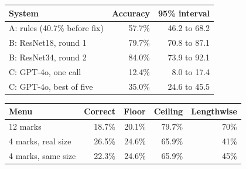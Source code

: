 \documentclass[border=6pt,multi=page]{standalone}
\begin{document}
\begin{page}
\begin{tabular}{lrr}\toprule
System & Accuracy & 95\% interval \\ \midrule
A: rules (40.7\% before fix) & 57.7\% & 46.2 to 68.2 \\
B: ResNet18, round 1 & 79.7\% & 70.8 to 87.1 \\
B: ResNet34, round 2 & 84.0\% & 73.9 to 92.1 \\
C: GPT-4o, one call & 12.4\% & 8.0 to 17.4 \\
C: GPT-4o, best of five & 35.0\% & 24.6 to 45.5 \\ \bottomrule
\end{tabular}
\end{page}
\begin{page}
\begin{tabular}{lrrrr}\toprule
Menu & Correct & Floor & Ceiling & Lengthwise \\ \midrule
12 marks & 18.7\% & 20.1\% & 79.7\% & 70\% \\
4 marks, real size & 26.5\% & 24.6\% & 65.9\% & 41\% \\
4 marks, same size & 22.3\% & 24.6\% & 65.9\% & 45\% \\ \bottomrule
\end{tabular}
\end{page}
\end{document}
